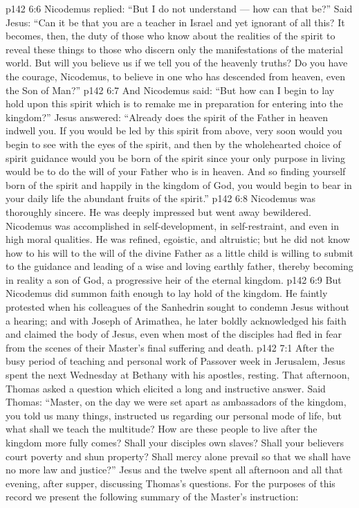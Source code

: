 \vs p142 6:6 Nicodemus replied: “But I do not understand --- how can that be?” Said Jesus: \textcolor{ubdarkred}{“Can it be that you are a teacher in Israel and yet ignorant of all this? It becomes, then, the duty of those who know about the realities of the spirit to reveal these things to those who discern only the manifestations of the material world. But will you believe us if we tell you of the heavenly truths? Do you have the courage, Nicodemus, to believe in one who has descended from heaven, even the Son of Man?”}
\vs p142 6:7 And Nicodemus said: “But how can I begin to lay hold upon this spirit which is to remake me in preparation for entering into the kingdom?” Jesus answered: \textcolor{ubdarkred}{“Already does the spirit of the Father in heaven indwell you. If you would be led by this spirit from above, very soon would you begin to see with the eyes of the spirit, and then by the wholehearted choice of spirit guidance would you be born of the spirit since your only purpose in living would be to do the will of your Father who is in heaven. And so finding yourself born of the spirit and happily in the kingdom of God, you would begin to bear in your daily life the abundant fruits of the spirit.”}
\vs p142 6:8 Nicodemus was thoroughly sincere. He was deeply impressed but went away bewildered. Nicodemus was accomplished in self\hyp{}development, in self\hyp{}restraint, and even in high moral qualities. He was refined, egoistic, and altruistic; but he did not know how to  his will to the will of the divine Father as a little child is willing to submit to the guidance and leading of a wise and loving earthly father, thereby becoming in reality a son of God, a progressive heir of the eternal kingdom.
\vs p142 6:9 But Nicodemus did summon faith enough to lay hold of the kingdom. He faintly protested when his colleagues of the Sanhedrin sought to condemn Jesus without a hearing; and with Joseph of Arimathea, he later boldly acknowledged his faith and claimed the body of Jesus, even when most of the disciples had fled in fear from the scenes of their Master’s final suffering and death.
\vs p142 7:1 After the busy period of teaching and personal work of Passover week in Jerusalem, Jesus spent the next Wednesday at Bethany with his apostles, resting. That afternoon, Thomas asked a question which elicited a long and instructive answer. Said Thomas: “Master, on the day we were set apart as ambassadors of the kingdom, you told us many things, instructed us regarding our personal mode of life, but what shall we teach the multitude? How are these people to live after the kingdom more fully comes? Shall your disciples own slaves? Shall your believers court poverty and shun property? Shall mercy alone prevail so that we shall have no more law and justice?” Jesus and the twelve spent all afternoon and all that evening, after supper, discussing Thomas’s questions. For the purposes of this record we present the following summary of the Master’s instruction:
